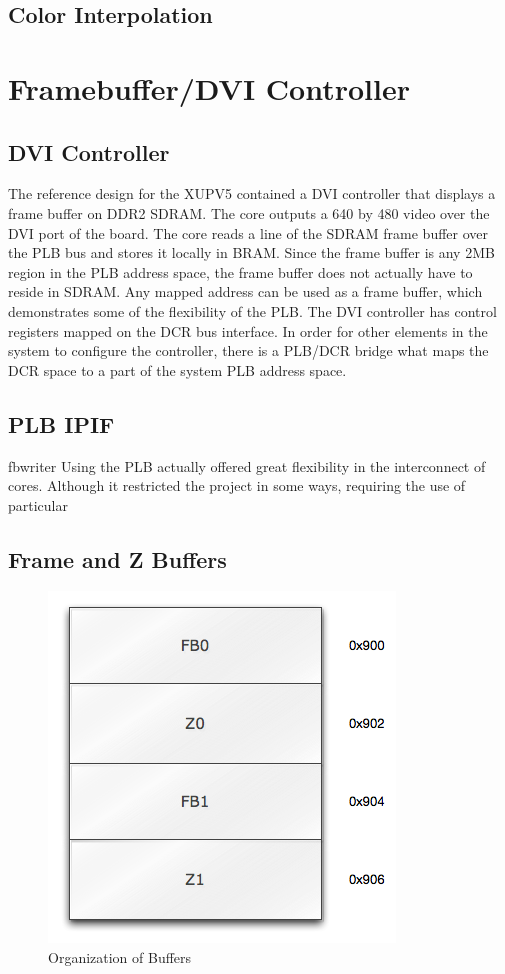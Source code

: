 \documentclass[letterpaper,10pt]{article}
\begin{document}
\subsection{Color Interpolation}

\section{Framebuffer/DVI Controller}

\subsection{DVI Controller}
The reference design for the XUPV5 contained a DVI controller that displays a frame buffer on DDR2 SDRAM.  The core outputs a 640 by 480 video over the DVI port of the board.  The core reads a line of the SDRAM frame buffer over the PLB bus and stores it locally in BRAM. Since the frame buffer is any 2MB region in the PLB address space, the frame buffer does not actually have to reside in SDRAM.  Any mapped address can be used as a frame buffer, which demonstrates some of the flexibility of the PLB.  The DVI controller has control registers mapped on the DCR bus interface.  In order for other elements in the system to configure the controller, there is a PLB/DCR bridge what maps the DCR space to a part of the system PLB address space.


\subsection{PLB IPIF}
fbwriter
Using the PLB actually offered great flexibility in the interconnect of cores.  Although it restricted the project in some ways, requiring the use of particular 

\subsection{Frame and Z Buffers}

\begin{figure}[htb]
\begin{center}
\includegraphics[scale=.68]{buffer_space.png}
\end{center}
\caption{Organization of Buffers}
\label{fig:buffer_space}
\end{figure}
\end{document}

